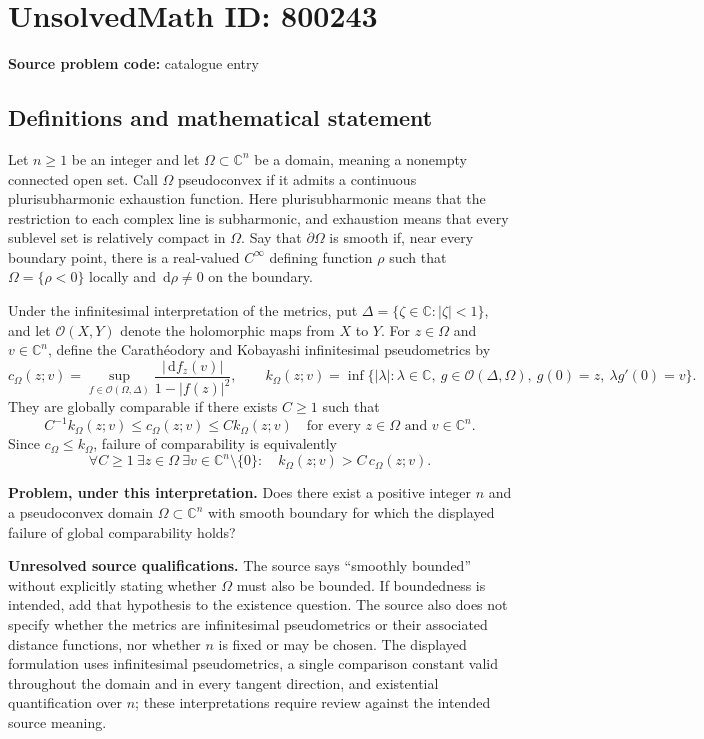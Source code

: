 \documentclass[11pt]{article}
\newcommand{\C}{\mathbb{C}}
\newcommand{\dd}{\,\mathrm{d}}
\begin{document}
\section*{UnsolvedMath ID: 800243}
\textbf{Source problem code:} catalogue entry
\subsection{Definitions and mathematical statement}
Let \(n\geq 1\) be an integer and let \(\Omega\subset\C^n\) be a domain, meaning a nonempty connected open set. Call \(\Omega\) pseudoconvex if it admits a continuous plurisubharmonic exhaustion function. Here plurisubharmonic means that the restriction to each complex line is subharmonic, and exhaustion means that every sublevel set is relatively compact in \(\Omega\). Say that \(\partial\Omega\) is smooth if, near every boundary point, there is a real-valued \(C^\infty\) defining function \(\rho\) such that \(\Omega=\{\rho<0\}\) locally and \(\dd\rho\neq0\) on the boundary.

Under the infinitesimal interpretation of the metrics, put \(\Delta=\{\zeta\in\C:|\zeta|<1\}\), and let \(\mathcal O(X,Y)\) denote the holomorphic maps from \(X\) to \(Y\). For \(z\in\Omega\) and \(v\in\C^n\), define the Carath\'eodory and Kobayashi infinitesimal pseudometrics by
\[
 c_\Omega(z;v)=\sup_{f\in\mathcal O(\Omega,\Delta)}\frac{|\dd f_z(v)|}{1-|f(z)|^2},
 \qquad
 k_\Omega(z;v)=\inf\bigl\{|\lambda|:\lambda\in\C,\ g\in\mathcal O(\Delta,\Omega),\ g(0)=z,\ \lambda g'(0)=v\bigr\}.
\]
They are globally comparable if there exists \(C\geq1\) such that
\[
 C^{-1}k_\Omega(z;v)\leq c_\Omega(z;v)\leq Ck_\Omega(z;v)
 \quad\text{for every }z\in\Omega\text{ and }v\in\C^n.
\]
Since \(c_\Omega\leq k_\Omega\), failure of comparability is equivalently
\[
 \forall C\geq1\ \exists z\in\Omega\ \exists v\in\C^n\setminus\{0\}:\quad
 k_\Omega(z;v)>C\,c_\Omega(z;v).
\]

\textbf{Problem, under this interpretation.} Does there exist a positive integer \(n\) and a pseudoconvex domain \(\Omega\subset\C^n\) with smooth boundary for which the displayed failure of global comparability holds?

\textbf{Unresolved source qualifications.} The source says ``smoothly bounded'' without explicitly stating whether \(\Omega\) must also be bounded. If boundedness is intended, add that hypothesis to the existence question. The source also does not specify whether the metrics are infinitesimal pseudometrics or their associated distance functions, nor whether \(n\) is fixed or may be chosen. The displayed formulation uses infinitesimal pseudometrics, a single comparison constant valid throughout the domain and in every tangent direction, and existential quantification over \(n\); these interpretations require review against the intended source meaning.
\end{document}
